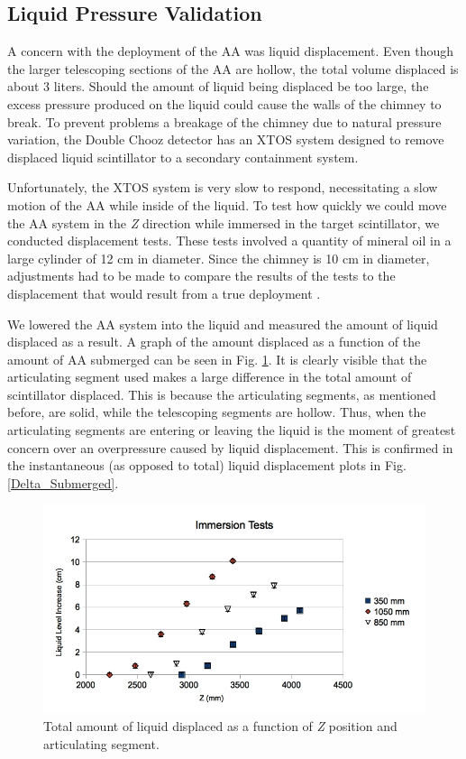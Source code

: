 \subsection{Liquid Pressure Validation}
 A concern with the deployment of the AA was liquid displacement. Even though the larger telescoping sections of the AA are hollow, the total volume displaced is about 3 liters.  Should the amount of liquid being displaced be too large, the excess pressure produced on the liquid could cause the walls of the chimney to break. To prevent problems a breakage of the chimney due to natural pressure variation, the Double Chooz detector has an XTOS system designed to remove displaced liquid scintillator to a secondary containment system.  
 
 Unfortunately, the XTOS system is very slow to respond, necessitating a slow motion of the AA while inside of the liquid. To test how quickly we could move the AA system in the \emph{Z} direction while immersed in the target scintillator, we conducted displacement tests. These tests involved a quantity of mineral oil in a large cylinder of 12 cm in diameter. Since the chimney is 10 cm in diameter, adjustments had to be made to compare the results of the tests to the displacement that would result from a true deployment \cite{Archimedes}. 


We lowered the AA system into the liquid and measured the amount of liquid displaced as a result. A graph of the amount displaced as a function of the amount of AA submerged can be seen in Fig. \ref{Submerged}. It is clearly visible that the articulating segment used makes a large difference in the total amount of scintillator displaced. This is because the articulating segments, as mentioned before, are solid, while the telescoping segments are hollow. Thus, when the articulating segments are entering or leaving the liquid is the moment of greatest concern over an overpressure caused by liquid displacement. This is confirmed in the instantaneous (as opposed to total) liquid displacement plots in Fig. \ref{Delta_Submerged}. 

\begin{figure}
\includegraphics[width=\textwidth]{AA/Total_Displacement.jpg}
\caption{Total amount of liquid displaced as a function of \emph{Z} position and articulating segment.}
\label{Submerged}
\end{figure}


